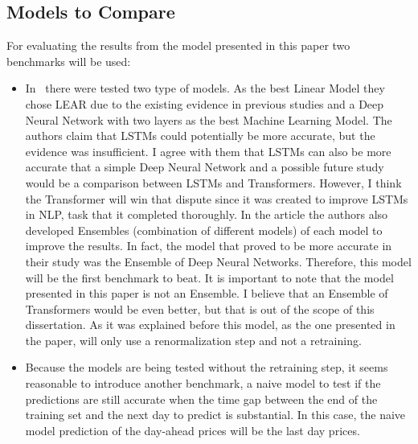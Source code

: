 \documentclass[journal]{IEEEtran}
\begin{document}
\subsection{Models to Compare}
\label{sec: case study, definition, models to compare}
For evaluating the results from the model presented in this paper two benchmarks will be used:
\begin{itemize}
    \item In~\cite{lagoForecastingDayaheadElectricity2021} there were tested two type of models. As the best Linear Model they chose LEAR due to the existing evidence in previous studies and a Deep Neural Network with two layers as the best Machine Learning Model. The authors claim that LSTMs could potentially be more accurate, but the evidence was insufficient. I agree with them that LSTMs can also be more accurate that a simple Deep Neural Network and a possible future study would be a comparison between LSTMs and Transformers. However, I think the Transformer will win that dispute since it was created to improve LSTMs in NLP, task that it completed thoroughly. In the article the authors also developed Ensembles (combination of different models) of each model to improve the results. In fact, the model that proved to be more accurate in their study was the Ensemble of Deep Neural Networks. Therefore, this model will be the first benchmark to beat. It is important to note that the model presented in this paper is not an Ensemble. I believe that an Ensemble of Transformers would be even better, but that is out of the scope of this dissertation. As it was explained before this model, as the one presented in the paper, will only use a renormalization step and not a retraining.
    \item Because the models are being tested without the retraining step, it seems reasonable to introduce another benchmark, a naive model to test if the predictions are still accurate when the time gap between the end of the training set and the next day to predict is substantial. In this case, the naive model prediction of the day-ahead prices will be the last day prices.
\end{itemize}
\end{document}
